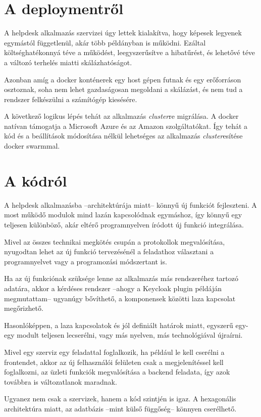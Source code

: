\section{A deploymentről}

A helpdesk alkalmazás szervizei úgy lettek kialakítva, hogy képesek legyenek egymástól függetlenül, akár több példányban is működni. Ezáltal költséghatékonnyá téve a működést, leegyszerűsítve a hibatűrést, és lehetővé téve a változó terhelés miatti skálázhatóságot.

Azonban amíg a docker konténerek egy host gépen futnak és egy erőforráson osztoznak, soha nem lehet gazdaságosan megoldani a skálázást, és nem tud a rendszer felkészülni a számítógép kiesésére.

A következő logikus lépés tehát az alkalmazás \textit{cluster}re migrálása. A docker natívan támogatja a Microsoft Azure és az Amazon \cite{docker_website_deploy_ECS} szolgáltatókat. Így tehát a kód és a beállítások módosítása nélkül lehetséges az alkalmazás \textit{cluster}esítése docker swarmmal.

\bigskip
\section{A kódról}
A helpdesk alkalmazásba --architektúrája miatt-- könnyű új funkciót fejleszteni. A most működő modulok mind lazán kapcsolódnak egymáshoz, így könnyű egy teljesen különböző, akár eltérő programnyelven íródott új funkció integrálása.

Mivel az összes technikai megkötés csupán a protokollok megvalósítása, nyugodtan lehet az új funkció tervezésénél a feladathoz választani a programnyelvet vagy a programozási módszertant is. 

Ha az új funkciónak szüksége lenne az alkalmazás más rendszeréhez tartozó adatára, akkor a kérdéses rendszer --ahogy a Keycloak plugin példáján megmutattam-- ugyanúgy bővíthető, a komponensek közötti laza kapcsolat megőrizhető.

Hasonlóképpen, a laza kapcsolatok és jól definiált határok miatt, egyszerű egy-egy modult teljesen lecserélni, vagy más nyelven, más technológiával újraírni.

Mivel egy szerviz egy feladattal foglalkozik, ha például le	 kell cserélni a frontendet, akkor az új felhasználói felületen csak a megjelenítéssel kell foglalkozni, az üzleti funkciók megvalósítása a backend feladata, így azok továbbra is változatlanok maradnak.

Ugyanez nem csak a szervizek, hanem a kód szintjén is igaz. A hexagonális architektúra miatt, az adatbázis --mint külső függőség-- könnyen cserélhető. 

